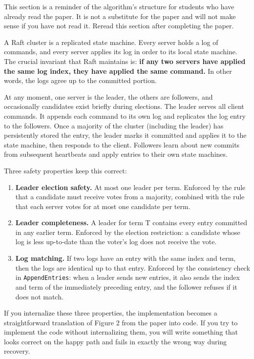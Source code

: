 \documentclass[11pt,a4paper]{article}
\begin{document}
This section is a reminder of the algorithm's structure for students who have already read the paper. It is not a substitute for the paper and will not make sense if you have not read it. Reread this section after completing the paper.

A Raft cluster is a replicated state machine. Every server holds a log of commands, and every server applies its log in order to its local state machine. The crucial invariant that Raft maintains is: \textbf{if any two servers have applied the same log index, they have applied the same command.} In other words, the logs agree up to the committed portion.

At any moment, one server is the leader, the others are followers, and occasionally candidates exist briefly during elections. The leader serves all client commands. It appends each command to its own log and replicates the log entry to the followers. Once a majority of the cluster (including the leader) has persistently stored the entry, the leader marks it committed and applies it to the state machine, then responds to the client. Followers learn about new commits from subsequent heartbeats and apply entries to their own state machines.

Three safety properties keep this correct:

\begin{enumerate}
\item \textbf{Leader election safety.} At most one leader per term. Enforced by the rule that a candidate must receive votes from a majority, combined with the rule that each server votes for at most one candidate per term.

\item \textbf{Leader completeness.} A leader for term T contains every entry committed in any earlier term. Enforced by the election restriction: a candidate whose log is less up-to-date than the voter's log does not receive the vote.

\item \textbf{Log matching.} If two logs have an entry with the same index and term, then the logs are identical up to that entry. Enforced by the consistency check in \texttt{AppendEntries}: when a leader sends new entries, it also sends the index and term of the immediately preceding entry, and the follower refuses if it does not match.
\end{enumerate}

If you internalize these three properties, the implementation becomes a straightforward translation of Figure 2 from the paper into code. If you try to implement the code without internalizing them, you will write something that looks correct on the happy path and fails in exactly the wrong way during recovery.
\end{document}
